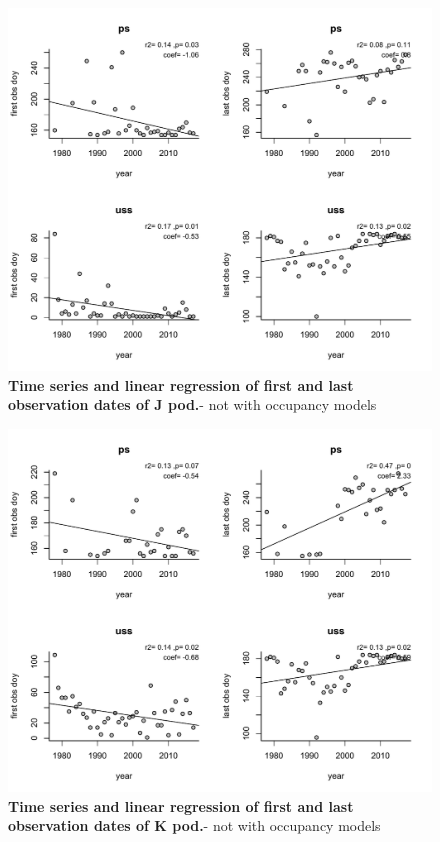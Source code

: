 \documentclass{article}
\begin{document}
\begin{figure}[p]
\includegraphics{../analyses/orcaphen/figures/J_linreg_1978_2017.pdf} 
\caption{\textbf{Time series and linear regression of first and last observation dates of J pod.}- not with occupancy models}
 \label{fig:J}
 \end{figure}
\begin{figure}[p]
\includegraphics{../analyses/orcaphen/figures/K_linreg_1978_2017.pdf} 
\caption{\textbf{Time series and linear regression of first and last observation dates of K pod.}- not with occupancy models}
 \label{fig:K}
 \end{figure}
 
\end{document}
